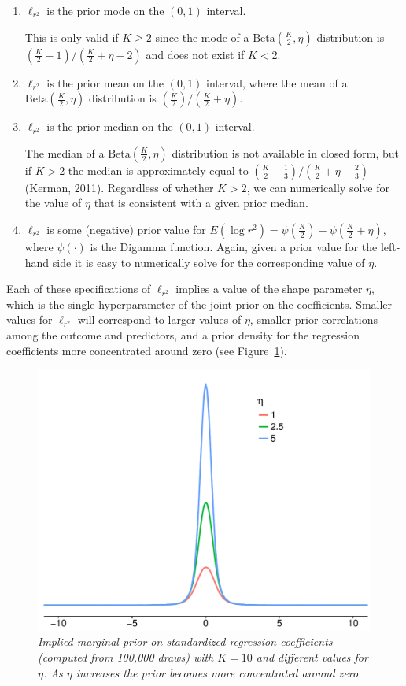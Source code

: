 \documentclass[11pt]{article}
\newcommand{\locRsq}{\ell_{r^2}}
\newcommand{\halfK}{\frac{K}{2}}
\newcommand{\Betadist}[2]{\mathrm{Beta}\left(#1,#2\right)}
\newcommand{\Digamma}[1]{\psi\left(#1\right)}
\begin{document}
\begin{enumerate}
\item $\locRsq$ is the prior mode on the $\left(0,1\right)$ interval.

This is only valid if $K \geq 2$ since the mode of a $\Betadist{\halfK}{\eta}$
distribution is \newline
$\left(\halfK - 1\right) / \left(\halfK + \eta - 2\right)$
and does not exist if $K < 2$.

\item $\locRsq$ is the prior mean on the $\left(0,1\right)$ interval, where
the mean of a $\Betadist{\halfK}{\eta}$ distribution is
$\left(\halfK\right) / \left(\halfK + \eta\right)$.

\item $\locRsq$ is the prior median on the $\left(0,1\right)$ interval.

The median of a $\Betadist{\halfK}{\eta}$ distribution is not available in
closed form, but if $K > 2$ the median is approximately equal to
$\left(\halfK - \frac{1}{3}\right) / \left(\halfK + \eta - \frac{2}{3}\right)$
(Kerman, 2011). Regardless of whether $K > 2$, we can numerically solve for the
value of $\eta$ that is consistent with a given prior median.

\item $\locRsq$ is some (negative) prior value for
$E\left(\log{r^2}\right) = \Digamma{\halfK} - \Digamma{\halfK + \eta}$,
where $\Digamma{\cdot}$ is the Digamma function. Again, given a prior value for
the left-hand side it is easy to numerically solve for the corresponding value
of $\eta$.
\end{enumerate}
%
Each of these specifications of $\locRsq$ implies a value of the shape parameter
$\eta$, which is the single hyperparameter of the joint prior on the
coefficients. Smaller values for $\locRsq$ will correspond to larger values of
$\eta$, smaller prior correlations among the outcome and predictors, and a prior
density for the regression coefficients more concentrated around zero (see
Figure~\ref{fig:betaplot}).

\begin{figure}
\centering
\includegraphics[width=.67\textwidth]{betaplot.pdf}{\vspace{-.5cm}}
\caption{\em Implied marginal prior on standardized regression coefficients
(computed from 100,000 draws) with $K = 10$ and different values for $\eta$. As
$\eta$ increases the prior becomes more concentrated around zero.}
\label{fig:betaplot}
\end{figure}
\end{document}
